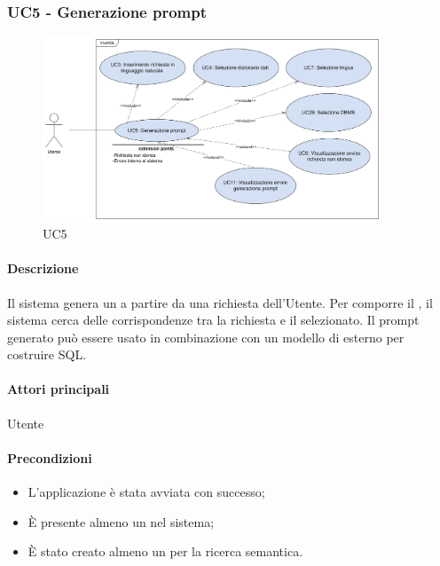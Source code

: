 \subsubsection{UC5 - Generazione prompt}\label{UC5}

\begin{figure}[H]
  \centering
  \includegraphics[width=0.90\textwidth]{assets/uc5.png}
  \caption{UC5}
\end{figure}

\paragraph*{Descrizione}
Il sistema genera un  a partire da una richiesta dell'Utente. Per comporre il , il sistema cerca delle corrispondenze tra la richiesta e il  selezionato. Il prompt generato può essere usato in combinazione con un modello di  esterno per costruire  SQL.

\paragraph*{Attori principali}
Utente

\paragraph*{Precondizioni}
\begin{itemize}
  \item L'applicazione è stata avviata con successo;
  \item È presente almeno un  nel sistema;
  \item È stato creato almeno un  per la ricerca semantica.
\end{itemize}

